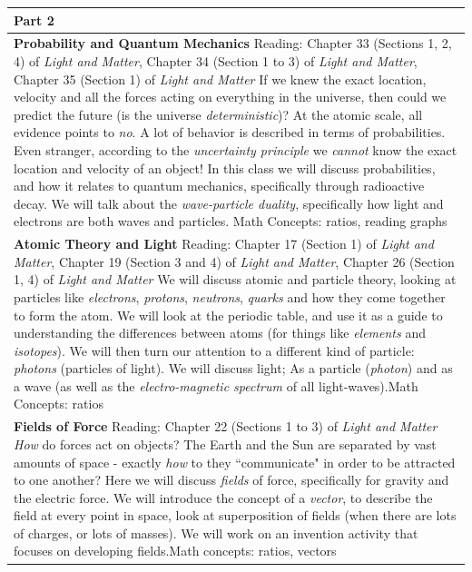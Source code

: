 \documentclass[12pt]{article}
\begin{document}
\noindent \begin{tabularx}{\textwidth}[c]{| X |}
\hline
	{\textbf{\large Part 2}} \\ \hline
	\textbf{Probability and Quantum Mechanics} \newline Reading: Chapter 33 (Sections 1, 2, 4) of \textit{Light and Matter}, Chapter 34 (Section 1 to 3) of \textit{Light and Matter}, Chapter 35 (Section 1) of \textit{Light and Matter} \newline If we knew the exact location, velocity and all the forces acting on everything in the universe, then could we predict the future (is the universe \textit{deterministic})? At the atomic scale, all evidence points to \textit{no}. A lot of behavior is described in terms of probabilities. Even stranger, according to the \textit{uncertainty principle} we \textit{cannot} know the exact location and velocity of an object! In this class we will discuss probabilities, and how it relates to quantum mechanics, specifically through radioactive decay. We will talk about the \textit{wave-particle duality}, specifically how light and electrons are both waves and particles. \newline Math Concepts: ratios, reading graphs\\ \hline
	\textbf{Atomic Theory and Light} \newline Reading: Chapter 17 (Section 1) of \textit{Light and Matter}, Chapter 19 (Section 3 and 4) of \textit{Light and Matter}, Chapter 26 (Section 1, 4) of \textit{Light and Matter} \newline We will discuss atomic and particle theory, looking at particles like \textit{electrons}, \textit{protons}, \textit{neutrons}, \textit{quarks} and how they come together to form the atom. We will look at the periodic table, and use it as a guide to understanding the differences between atoms (for things like \textit{elements} and \textit{isotopes}). We will then turn our attention to a different kind of particle: \textit{photons} (particles of light). We will discuss light; As a particle (\textit{photon}) and as a wave (as well as the \textit{electro-magnetic spectrum} of all light-waves).\newline Math Concepts: ratios\\ \hline
	\textbf{Fields of Force} \newline Reading: Chapter 22 (Sections 1 to 3) of \textit{Light and Matter} \newline \textit{How} do forces act on objects? The Earth and the Sun are separated by vast amounts of space - exactly \textit{how} to they ``communicate" in order to be attracted to one another? Here we will discuss \textit{fields} of force, specifically for gravity and the electric force. We will introduce the concept of a \textit{vector}, to describe the field at every point in space, look at superposition of fields (when there are lots of charges, or lots of masses). We will work on an invention activity that focuses on developing fields.\newline Math concepts: ratios, vectors\\ \hline
	\end{tabularx}
\end{document}
